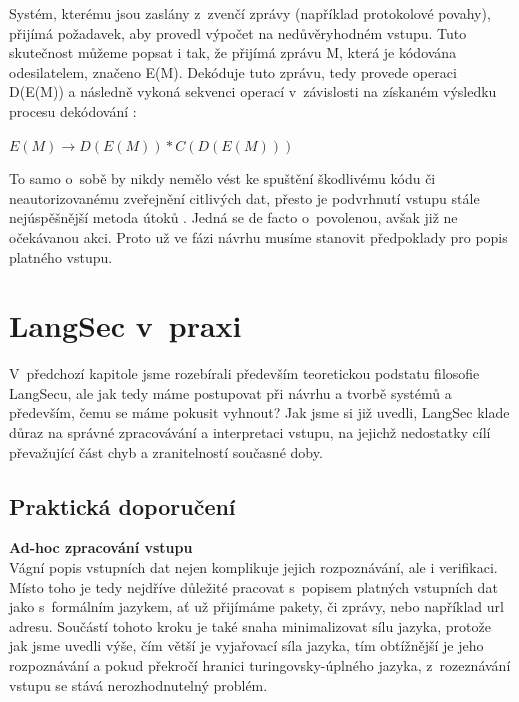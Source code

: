 Systém, kterému jsou zaslány z~zvenčí zprávy (například protokolové povahy), přijímá požadavek, aby provedl výpočet na nedůvěryhodném vstupu. 
Tuto skutečnost můžeme popsat i tak, že přijímá zprávu M, která je kódována odesilatelem, značeno E(M). Dekóduje tuto zprávu, tedy provede operaci 
D(E(M)) a následně vykoná sekvenci operací v~závislosti na získaném výsledku procesu dekódování \cite[str. 492]{Sass2013}:
\vspace*{\baselineskip}
\begin{center}  
$E(M) \rightarrow D(E(M)) * C(D(E(M))) $
\end{center}
\vspace*{\baselineskip}
To samo o~sobě by nikdy nemělo vést ke spuštění škodlivému kódu či neautorizovanému zveřejnění citlivých dat, přesto je podvrhnutí vstupu stále 
nejúspěšnější metoda útoků \cite[str. 492]{Sass2013}. Jedná se de facto o~povolenou, avšak již ne očekávanou akci. Proto už ve fázi návrhu 
musíme stanovit předpoklady pro popis platného vstupu. 


\chapter{LangSec v~praxi} \label{ch:langsecapp}
V~předchozí kapitole jsme rozebírali především teoretickou podstatu filosofie LangSecu, ale jak tedy máme postupovat při návrhu a tvorbě systémů
a především, čemu se máme pokusit vyhnout? Jak jsme si již uvedli, LangSec klade důraz na správné zpracovávání a interpretaci vstupu, na jejichž 
nedostatky cílí převažující část chyb a zranitelností současné doby.

\section{Praktická doporučení} \label{sec:5:dosanddonts}

\textbf{Ad-hoc zpracování vstupu} \\
Vágní popis vstupních dat nejen komplikuje jejich rozpoznávání, ale i verifikaci.
Místo toho je tedy nejdříve důležité pracovat s~popisem platných vstupních dat jako s~formálním jazykem, ať už přijímáme pakety, či zprávy, nebo 
například url adresu. Součástí tohoto kroku je také snaha minimalizovat sílu jazyka, protože jak jsme uvedli výše, čím větší je vyjařovací síla 
jazyka, tím obtížnější je jeho rozpoznávání a pokud překročí hranici turingovsky-úplného jazyka, z~rozeznávání vstupu se stává nerozhodnutelný 
problém. \\

